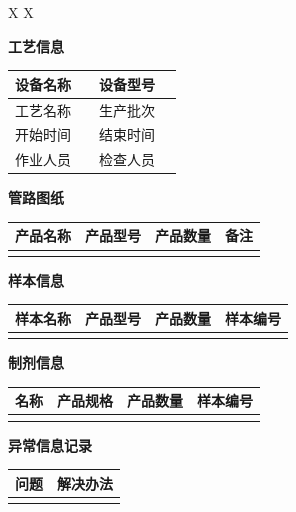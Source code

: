 \documentclass[UTF8,10pt,a4paper,fontset=fandol]{ctexart}
\begin{document}
\begin{tabularx}{\textwidth}{X X}
\begin{minipage}[t]{\linewidth}
\textbf{工艺信息}

{\begin{tabularx}{\linewidth}{|l|X|l|X|}
\hline
设备名称 & %
& 设备型号 & %
\\ \hline
工艺名称 & %
& 生产批次 & %
\\ \hline
开始时间 & %
& 结束时间 & %
\\ \hline
作业人员 & %
& 检查人员 & %
\\ \hline
\end{tabularx}}

\vspace{0.5em}
\textbf{管路图纸}

{\begin{tabularx}{\linewidth}{|X|X|X|X|}
\hline
产品名称 & 产品型号 & 产品数量 & 备注 \\ \hline
 & & & \\ \hline
\end{tabularx}}

\vspace{0.5em}
\textbf{样本信息}

{\begin{tabularx}{\linewidth}{|X|X|X|X|}
\hline
样本名称 & 产品型号 & 产品数量 & 样本编号 \\ \hline
 & & & \\ \hline
\end{tabularx}}

\vspace{0.5em}
\textbf{制剂信息}

{\begin{tabularx}{\linewidth}{|X|X|X|X|}
\hline
名称 & 产品规格 & 产品数量 & 样本编号 \\ \hline
 & & & \\ \hline
\end{tabularx}}

\vspace{0.5em}
\textbf{异常信息记录}

{\begin{tabularx}{\linewidth}{|X|X|}
\hline
问题 & 解决办法 \\ \hline
 & \\ \hline
\end{tabularx}}


\end{minipage}
\end{tabularx}
\end{document}
